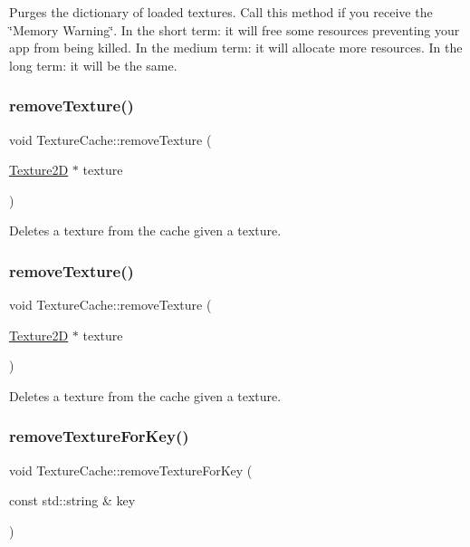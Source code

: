 Purges the dictionary of loaded textures. Call this method if you receive the \char`\"{}\+Memory Warning\char`\"{}. In the short term\+: it will free some resources preventing your app from being killed. In the medium term\+: it will allocate more resources. In the long term\+: it will be the same. \mbox{\label{classTextureCache_a346fc925fda0b7964bbb57f100275760}} 
\subsubsection{\texorpdfstring{remove\+Texture()}{removeTexture()}\hspace{0.1cm}{\footnotesize\ttfamily [1/2]}}
{\footnotesize\ttfamily void Texture\+Cache\+::remove\+Texture (\begin{DoxyParamCaption}\item[{\hyperlink{classTexture2D}{Texture2D} $\ast$}]{texture }\end{DoxyParamCaption})}

Deletes a texture from the cache given a texture. \mbox{\label{classTextureCache_a346fc925fda0b7964bbb57f100275760}} 
\subsubsection{\texorpdfstring{remove\+Texture()}{removeTexture()}\hspace{0.1cm}{\footnotesize\ttfamily [2/2]}}
{\footnotesize\ttfamily void Texture\+Cache\+::remove\+Texture (\begin{DoxyParamCaption}\item[{\hyperlink{classTexture2D}{Texture2D} $\ast$}]{texture }\end{DoxyParamCaption})}

Deletes a texture from the cache given a texture. \mbox{\label{classTextureCache_ad532b26bf9a162d34710aa38f776c134}} 
\subsubsection{\texorpdfstring{remove\+Texture\+For\+Key()}{removeTextureForKey()}\hspace{0.1cm}{\footnotesize\ttfamily [1/2]}}
{\footnotesize\ttfamily void Texture\+Cache\+::remove\+Texture\+For\+Key (\begin{DoxyParamCaption}\item[{const std\+::string \&}]{key }\end{DoxyParamCaption})}

